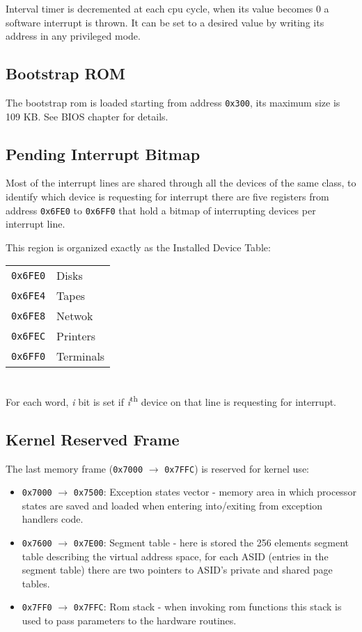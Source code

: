 Interval timer is decremented at each cpu cycle, when its value becomes 0 a software interrupt is thrown. It can be set to a desired value by writing its address in any privileged mode.

\subsection{Bootstrap ROM}
The bootstrap rom is loaded starting from address \texttt{0x300}, its maximum size is 109 KB.
See BIOS chapter for details.

\subsection{Pending Interrupt Bitmap}
Most of the interrupt lines are shared through all the devices of the same class, to identify which device is requesting for interrupt there are five registers from address \texttt{0x6FE0} to \texttt{0x6FF0} that hold a bitmap of interrupting devices per interrupt line.

This region is organized exactly as the Installed Device Table:
\\

\begin{tabular}{r|l}
\texttt{0x6FE0} & Disks \\
\texttt{0x6FE4} & Tapes \\
\texttt{0x6FE8} & Netwok \\
\texttt{0x6FEC} & Printers \\
\texttt{0x6FF0} & Terminals \\
\end{tabular}
\\

For each word, \emph{i} bit is set if \emph{i}\textsuperscript{th} device on that line is requesting for interrupt.

\subsection{Kernel Reserved Frame}
The last memory frame (\texttt{0x7000} $\rightarrow$ \texttt{0x7FFC}) is reserved for kernel use:
\begin{itemize}
\item \texttt{0x7000} $\rightarrow$ \texttt{0x7500}: Exception states vector - memory area in which processor states are saved and loaded when entering into/exiting from exception handlers code.
\item \texttt{0x7600} $\rightarrow$ \texttt{0x7E00}: Segment table - here is stored the 256 elements segment table describing the virtual address space, for each ASID (entries in the segment table) there are two pointers to ASID's private and shared page tables.
\item \texttt{0x7FF0} $\rightarrow$ \texttt{0x7FFC}: Rom stack - when invoking rom functions this stack is used to pass parameters to the hardware routines.
\end{itemize}

